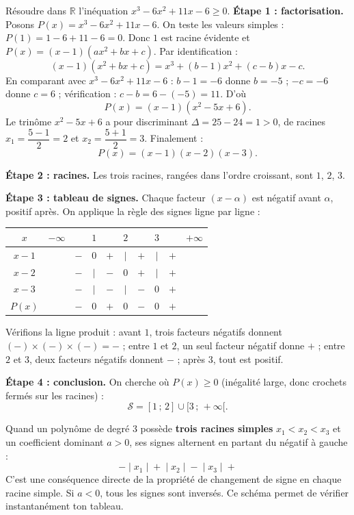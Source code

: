 \documentclass[11pt]{article}
\begin{document}
\begin{exoresolu}
Résoudre dans $\mathbb{R}$ l'inéquation $x^3 - 6x^2 + 11x - 6 \geq 0$.
\tcblower
\textbf{Étape 1 : factorisation.} Posons $P(x) = x^3 - 6x^2 + 11x - 6$. On teste les valeurs simples : $P(1) = 1 - 6 + 11 - 6 = 0$. Donc $1$ est racine évidente et $P(x) = (x-1)(ax^2+bx+c)$. Par identification :
\[ (x-1)(x^2+bx+c) = x^3 + (b-1)x^2 + (c-b)x - c. \]
En comparant avec $x^3 - 6x^2 + 11x - 6$ : $b-1 = -6$ donne $b=-5$ ; $-c = -6$ donne $c=6$ ; vérification : $c-b = 6-(-5) = 11$. D'où
\[ P(x) = (x-1)(x^2 - 5x + 6). \]
Le trinôme $x^2-5x+6$ a pour discriminant $\Delta = 25 - 24 = 1 > 0$, de racines $x_1 = \dfrac{5-1}{2} = 2$ et $x_2 = \dfrac{5+1}{2} = 3$. Finalement :
\[ P(x) = (x-1)(x-2)(x-3). \]

\textbf{Étape 2 : racines.} Les trois racines, rangées dans l'ordre croissant, sont $1$, $2$, $3$.

\textbf{Étape 3 : tableau de signes.} Chaque facteur $(x-\alpha)$ est négatif avant $\alpha$, positif après. On applique la règle des signes ligne par ligne :
\begin{center}
\begin{tabular}{|c|ccccccccc|}
\hline
\rowcolor{popblueL}
$x$ & $-\infty$ & & $1$ & & $2$ & & $3$ & & $+\infty$ \\
\hline
$x-1$ & & $-$ & $0$ & $+$ & $\vert$ & $+$ & $\vert$ & $+$ & \\
\hline
$x-2$ & & $-$ & $\vert$ & $-$ & $0$ & $+$ & $\vert$ & $+$ & \\
\hline
$x-3$ & & $-$ & $\vert$ & $-$ & $\vert$ & $-$ & $0$ & $+$ & \\
\hline
\rowcolor{popgreenL}
$P(x)$ & & $-$ & $0$ & $+$ & $0$ & $-$ & $0$ & $+$ & \\
\hline
\end{tabular}
\end{center}
Vérifions la ligne produit : avant $1$, trois facteurs négatifs donnent $(-)\times(-)\times(-) = -$ ; entre $1$ et $2$, un seul facteur négatif donne $+$ ; entre $2$ et $3$, deux facteurs négatifs donnent $-$ ; après $3$, tout est positif.

\textbf{Étape 4 : conclusion.} On cherche où $P(x) \geq 0$ (inégalité large, donc crochets fermés sur les racines) :
\[ \mathcal{S} = [1\,;\,2] \cup [3\,;\,+\infty[. \]
\end{exoresolu}

\begin{aretenir}
Quand un polynôme de degré 3 possède \textbf{trois racines simples} $x_1 < x_2 < x_3$ et un coefficient dominant $a > 0$, ses signes alternent en partant du négatif à gauche :
\[ - \;\Big|\; x_1 \;\Big|\; + \;\Big|\; x_2 \;\Big|\; - \;\Big|\; x_3 \;\Big|\; + \]
C'est une conséquence directe de la propriété de changement de signe en chaque racine simple. Si $a < 0$, tous les signes sont inversés. Ce schéma permet de vérifier instantanément ton tableau.
\end{aretenir}
\end{document}

